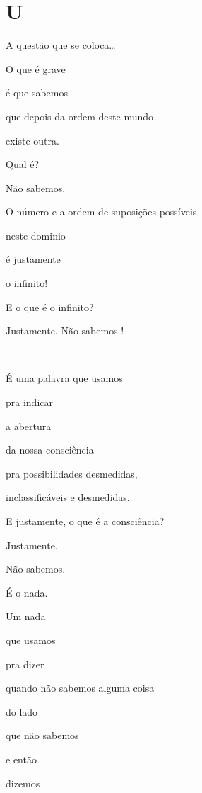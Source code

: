 
\section*{U}




A questão que se coloca\ldots{}

O que é grave

é que sabemos

que depois da ordem deste mundo

existe outra.

Qual é?

Não sabemos.

O número e a ordem de suposições possíveis

neste dominio

é justamente

o infinito!


E o que é o infinito?

Justamente. Não sabemos !

~

É uma palavra que usamos

pra indicar

a abertura

da nossa consciência

pra possibilidades desmedidas, 

inclassificáveis e desmedidas.




E justamente, o que é a consciência?

Justamente.

Não sabemos.

É o nada.

Um nada

que usamos

pra dizer

quando não sabemos alguma coisa

do lado

que não sabemos

e então

dizemos

